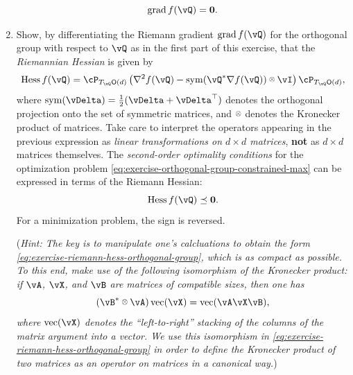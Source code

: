 \documentclass[../../book-main.tex]{subfiles}
\begin{document}
\begin{exercise}
\begin{enumerate}
        \begin{equation*}
            \mathrm{grad}\, f(\vQ) = \mathbf{0}.
        \end{equation*}
        \item Show, by differentiating the Riemann gradient $\mathrm{grad}\, f(\vQ)$ for the orthogonal group with respect to $\vQ$ as in the first part of this exercise, that the \textit{Riemannian Hessian} is given by
        \begin{equation}\label{eq:exercise-riemann-hess-orthogonal-group}
            \mathrm{Hess}\, f(\vQ) = \cP_{T_{\vQ}\O(d)} \left( 
            \nabla^2 f(\vQ) - \Symm(\vQ\adj \nabla f(\vQ)) \kron \vI
            \right) \cP_{T_{\vQ}\O(d)},
        \end{equation}
        where $\Symm(\vDelta) = \tfrac{1}{2}(\vDelta + \vDelta^\top)$ denotes the orthogonal projection onto the set of symmetric matrices, and $\kron$ denotes the Kronecker product of matrices.
        Take care to interpret the operators appearing in the previous expression as \textit{linear transformations on ${d \times d}$ matrices}, \textbf{not} as $d \times d$ matrices themselves.
        The \textit{second-order optimality conditions} for the optimization problem \eqref{eq:exercise-orthogonal-group-constrained-max} can be expressed in terms of the Riemann Hessian:
        \begin{equation*}
            \mathrm{Hess}\, f(\vQ) \preceq \mathbf{0}.
        \end{equation*}
        For a minimization problem, the sign is reversed.

        (\textit{Hint: The key is to manipulate one's calcluations to obtain the form \eqref{eq:exercise-riemann-hess-orthogonal-group}, which is as compact as possible. To this end, make use of the following isomorphism of the Kronecker product: if $\vA$, $\vX$, and $\vB$ are matrices of compatible sizes, then one has
        \begin{equation*}
            (\vB\adj \kron \vA) \Vec(\vX) = \Vec(\vA \vX \vB),
        \end{equation*}
        where $\Vec(\vX)$ denotes the ``left-to-right'' stacking of the columns of the matrix argument into a vector. We use this isomorphism in \eqref{eq:exercise-riemann-hess-orthogonal-group} in order to define the Kronecker product of two matrices as an operator on matrices in a canonical way.})
        

\end{enumerate}
\end{exercise}
\end{document}
